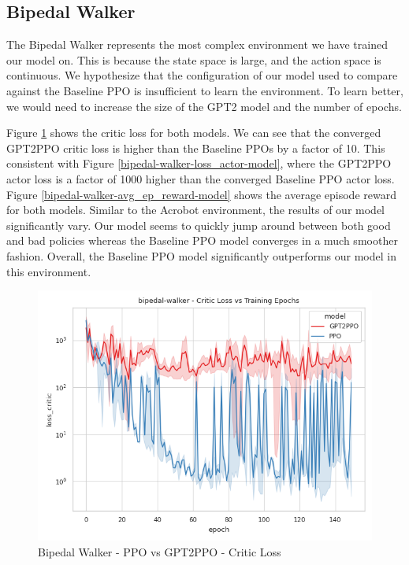 \subsection{Bipedal Walker}
The Bipedal Walker represents the most complex environment we have trained our model on. This is because the state space is large, and
the action space is continuous. We hypothesize that the configuration of our model used to compare against the Baseline PPO is
insufficient to learn the environment. To learn better, we would need to increase the size of the GPT2 model and the number of epochs.

Figure \ref{bipedal-walker-loss_critic-model} shows the critic loss for both models. We can see that the converged GPT2PPO critic loss is higher
than the Baseline PPOs by a factor of 10. This consistent with Figure \ref{bipedal-walker-loss_actor-model}, where the GPT2PPO actor loss is a factor of 1000
higher than the converged Baseline PPO actor loss.
Figure \ref{bipedal-walker-avg_ep_reward-model} shows the average episode reward for both models. Similar to the Acrobot environment,
the results of our model significantly vary. Our model seems to quickly jump around between both good and bad policies whereas the Baseline PPO model
converges in a much smoother fashion.
Overall, the Baseline PPO model significantly outperforms our model in this environment.

\begin{figure}[htbp]
    \centerline{\includegraphics[width=\columnwidth]{./img/bipedal-walker-loss_critic-model.png}}
    \caption{Bipedal Walker - PPO vs GPT2PPO - Critic Loss}
    \label{bipedal-walker-loss_critic-model}
\end{figure}

